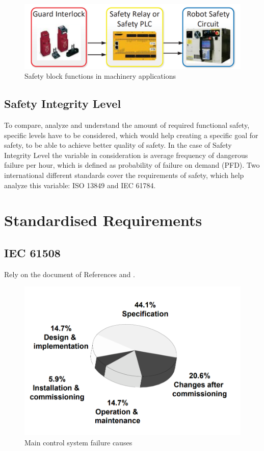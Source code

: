 \documentclass[conference]{IEEEtran}
\begin{document}
\begin{figure}[htbp]
\centerline{\includegraphics[scale=.4]{Machinery_FuSa.png}}
\caption{Safety block functions in machinery applications \cite{robinson_living_2019}}
\label{Interlock}
\end{figure}

\subsection{Safety Integrity Level}

To compare, analyze and understand the amount of required functional safety, specific levels have to be considered, which would help creating a specific goal for safety, to be able to achieve better quality of safety. In the case of Safety Integrity Level the variable in consideration is average frequency of dangerous failure per hour, which is defined as probability of failure on demand (PFD). Two international different standards cover the requirements of safety, which help analyze this variable: ISO 13849 and IEC 61784.

\section{Standardised Requirements}

\subsection{IEC 61508}

Rely on the document of References \cite{bell_introduction_nodate} and \cite{meany_functional_2017}.

\begin{figure}[htbp]
\centerline{\includegraphics[scale=.33]{61508_SysFail.png}}
\caption{Main control system failure causes \cite{bell_introduction_nodate}}
\label{timeline}
\end{figure}
\end{document}
